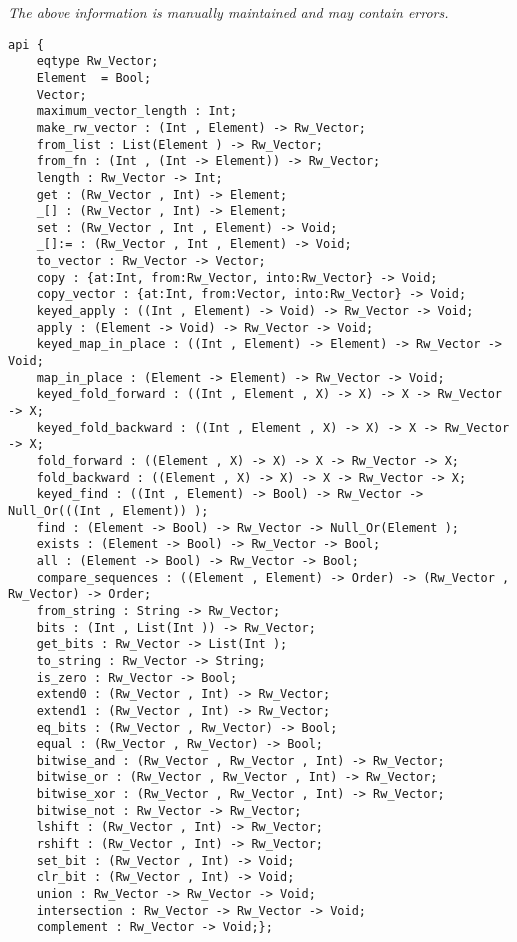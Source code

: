 \label{api:Rw\_Bool\_Vector}

{\tiny \it The above information is manually maintained and may contain errors.}
\begin{verbatim}
api {
    eqtype Rw_Vector;
    Element  = Bool;
    Vector;
    maximum_vector_length : Int;
    make_rw_vector : (Int , Element) -> Rw_Vector;
    from_list : List(Element ) -> Rw_Vector;
    from_fn : (Int , (Int -> Element)) -> Rw_Vector;
    length : Rw_Vector -> Int;
    get : (Rw_Vector , Int) -> Element;
    _[] : (Rw_Vector , Int) -> Element;
    set : (Rw_Vector , Int , Element) -> Void;
    _[]:= : (Rw_Vector , Int , Element) -> Void;
    to_vector : Rw_Vector -> Vector;
    copy : {at:Int, from:Rw_Vector, into:Rw_Vector} -> Void;
    copy_vector : {at:Int, from:Vector, into:Rw_Vector} -> Void;
    keyed_apply : ((Int , Element) -> Void) -> Rw_Vector -> Void;
    apply : (Element -> Void) -> Rw_Vector -> Void;
    keyed_map_in_place : ((Int , Element) -> Element) -> Rw_Vector -> Void;
    map_in_place : (Element -> Element) -> Rw_Vector -> Void;
    keyed_fold_forward : ((Int , Element , X) -> X) -> X -> Rw_Vector -> X;
    keyed_fold_backward : ((Int , Element , X) -> X) -> X -> Rw_Vector -> X;
    fold_forward : ((Element , X) -> X) -> X -> Rw_Vector -> X;
    fold_backward : ((Element , X) -> X) -> X -> Rw_Vector -> X;
    keyed_find : ((Int , Element) -> Bool) -> Rw_Vector -> Null_Or(((Int , Element)) );
    find : (Element -> Bool) -> Rw_Vector -> Null_Or(Element );
    exists : (Element -> Bool) -> Rw_Vector -> Bool;
    all : (Element -> Bool) -> Rw_Vector -> Bool;
    compare_sequences : ((Element , Element) -> Order) -> (Rw_Vector , Rw_Vector) -> Order;
    from_string : String -> Rw_Vector;
    bits : (Int , List(Int )) -> Rw_Vector;
    get_bits : Rw_Vector -> List(Int );
    to_string : Rw_Vector -> String;
    is_zero : Rw_Vector -> Bool;
    extend0 : (Rw_Vector , Int) -> Rw_Vector;
    extend1 : (Rw_Vector , Int) -> Rw_Vector;
    eq_bits : (Rw_Vector , Rw_Vector) -> Bool;
    equal : (Rw_Vector , Rw_Vector) -> Bool;
    bitwise_and : (Rw_Vector , Rw_Vector , Int) -> Rw_Vector;
    bitwise_or : (Rw_Vector , Rw_Vector , Int) -> Rw_Vector;
    bitwise_xor : (Rw_Vector , Rw_Vector , Int) -> Rw_Vector;
    bitwise_not : Rw_Vector -> Rw_Vector;
    lshift : (Rw_Vector , Int) -> Rw_Vector;
    rshift : (Rw_Vector , Int) -> Rw_Vector;
    set_bit : (Rw_Vector , Int) -> Void;
    clr_bit : (Rw_Vector , Int) -> Void;
    union : Rw_Vector -> Rw_Vector -> Void;
    intersection : Rw_Vector -> Rw_Vector -> Void;
    complement : Rw_Vector -> Void;};
\end{verbatim}
